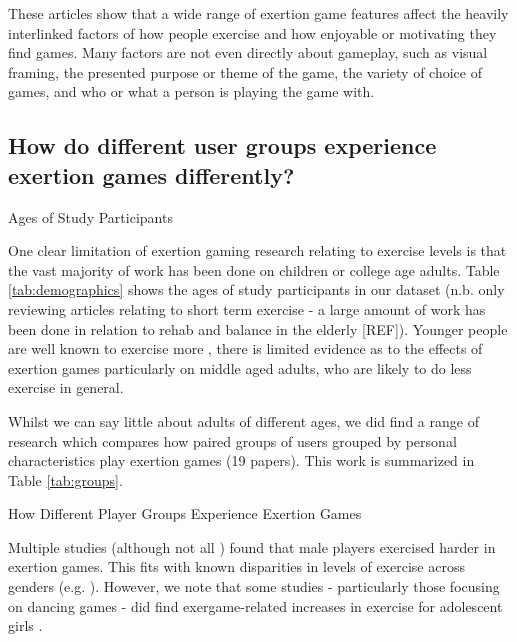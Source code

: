 These articles show that a wide range of exertion game features affect the heavily interlinked factors of how people exercise and how enjoyable or motivating they find games. Many factors are not even directly about gameplay, such as visual framing, the presented purpose or theme of the game, the variety of choice of games, and who or what a person is playing the game with. 

\subsection{How do different user groups experience exertion games differently?}

\begin{table}
\caption{Ages of Study Participants}
\label{tab:demographics}
\centering

\end{table}

One clear limitation of exertion gaming research relating to exercise levels is that the vast majority of work has been done on children or college age adults. Table \ref{tab:demographics} shows the ages of study participants in our dataset (n.b. only reviewing articles relating to short term exercise - a large amount of work has been done in relation to rehab and balance in the elderly [REF]). Younger people are well known to exercise more \cite{bhf_2015},  there is limited evidence as to the effects of exertion games particularly on middle aged adults, who are likely to do less exercise in general.  

Whilst we can say little about adults of different ages, we did find a range of research which compares how paired groups of users grouped by personal characteristics play exertion games (19 papers). This work is summarized in Table \ref{tab:groups}. 

\begin{table}
\caption{How Different Player Groups Experience Exertion Games}
\label{tab:groups}
\centering

\end{table}

Multiple studies \cite{Clevenger2015EnergyKinect,McNarry2016InvestigatingChildren,Lam2011PlayAlternatives} (although not all \cite{Lin2015TheGames}) found that male players exercised harder in exertion games. This fits with known disparities in levels of exercise across genders (e.g. \cite{te2007patterns}). However, we note that some studies - particularly those focusing on dancing games - did find exergame-related increases in exercise for adolescent girls \cite{Fawkner2010AdolescentGaming}.

